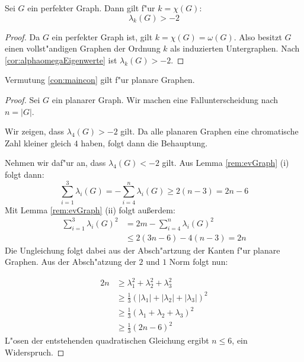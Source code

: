 \begin{proposition}
  Sei $G$ ein perfekter Graph. Dann gilt f"ur $k=\chi(G)$:
  $$\lambda_{k}(G) > -2$$
\end{proposition}

\begin{proof}
  Da $G$ ein perfekter Graph ist, gilt $k = \chi(G) = \omega(G)$. Also besitzt $G$ einen vollst"andigen Graphen der Ordnung $k$ als induzierten Untergraphen. Nach \ref{cor:alphaomegaEigenwerte} ist $\lambda_{k}(G) > -2$.
\end{proof}

\begin{proposition}
  Vermutung \ref{con:maincon} gilt f"ur planare Graphen.
\end{proposition}

\begin{proof}
  Sei $G$ ein planarer Graph. Wir machen eine Fallunterscheidung nach $n = |G|$. 
  \todo{}

  \parindent 0pt 
  Wir zeigen, dass $\lambda_4(G) > -2$ gilt. Da alle planaren Graphen eine chromatische Zahl kleiner gleich $4$ haben, folgt dann die Behauptung.

  Nehmen wir daf"ur an, dass $\lambda_{4}(G) < -2$ gilt.
  Aus Lemma \ref{rem:evGraph} (i) folgt dann:
  \begin{equation*}
    \sum\limits_{i=1}^3 \lambda_{i}(G) = -\sum\limits_{i=4}^{n}\lambda_{i}(G) \geq 2 (n-3) = 2n-6
  \end{equation*}
  Mit Lemma \ref{rem:evGraph} (ii) folgt au{\ss}erdem:
  \begin{align*}
    \sum\limits_{i=1}^3 \lambda_{i}(G)^{2} &= 2m -\sum\limits_{i=4}^{n}\lambda_{i}(G)^{2} \\
    &\leq 2(3n-6) -4(n-3) = 2n
  \end{align*}
  Die Ungleichung folgt dabei aus der Absch"artzung der Kanten f"ur planare Graphen. Aus der Absch"atzung der $2$ und $1$ Norm folgt nun:

  \begin{align*}
    2n &\geq \lambda_{1}^{2} +\lambda_{2}^{2} +\lambda_{3}^{2}  \\ &\geq \frac{1}{3} (|\lambda_{1}| + |\lambda_2| + |\lambda_3|)^{2} \\
    &\geq \frac{1}{3}(\lambda_{1}+ \lambda_2 + \lambda_3)^{2}\\ &\geq \frac{1}{3}(2n-6)^{2}
  \end{align*}
  L"osen der entstehenden quadratischen Gleichung ergibt $n\leq 6$, ein Widerspruch.
\end{proof} 

